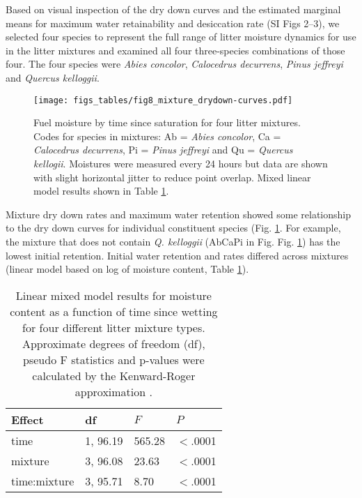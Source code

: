 \documentclass[letterpaper,12pt]{article}
\begin{document}
Based on visual inspection of the dry down curves and the estimated marginal
means for maximum water retainability and desiccation rate (SI Figs 2--3), we
selected four species to represent the full range of litter moisture dynamics
for use in the litter mixtures and examined all four three-species combinations
of those four. The four species were \emph{Abies concolor}, \emph{Calocedrus
  decurrens}, \emph{Pinus jeffreyi} and \emph{Quercus kelloggii}.

\begin{figure}[h]
  \centering
\texttt{[image: figs\_tables/fig8\_mixture\_drydown-curves.pdf]}
\caption{Fuel moisture by time since saturation for four litter mixtures.  Codes for species in mixtures: Ab = \emph{Abies concolor}, Ca = \emph{Calocedrus decurrens}, Pi = \emph{Pinus jeffreyi} and Qu = \emph{Quercus kellogii}. Moistures were measured every 24 hours but data are shown with slight horizontal jitter to reduce point overlap. Mixed linear model results shown in Table \ref{tab:mixtures_drydown}.}
  \label{fig:mixture_dry_down}
\end{figure}

Mixture dry down rates and maximum water retention showed some relationship to
the dry down curves for individual constituent species (Fig.
\ref{fig:mixture_dry_down}. For example, the mixture that does not contain
\emph{Q. kelloggii} (AbCaPi in Fig. Fig. \ref{fig:mixture_dry_down}) has the
lowest initial retention. Initial water retention and rates differed across
mixtures (linear model based on log of moisture content, Table
\ref{tab:mixtures_drydown}).

\begin{table}[h]
  \caption{Linear mixed model results for moisture content as a function of
    time since wetting for four different litter mixture types. Approximate
    degrees of freedom (df), pseudo F statistics and p-values were calculated
    by the Kenward-Roger approximation \citep{Kenward_Roger-1997}.}
  \label{tab:mixtures_drydown}
\centering

\begin{tabular}{llll}
  \toprule
Effect & df & $F$ & $P$ \\ 
  \midrule
time & 1, 96.19 & 565.28 & $<$.0001 \\ 
  mixture & 3, 96.08 & 23.63 & $<$.0001 \\ 
  time:mixture & 3, 95.71 & 8.70 & $<$.0001 \\ 
   \bottomrule
\end{tabular}
\end{table}
\end{document}
